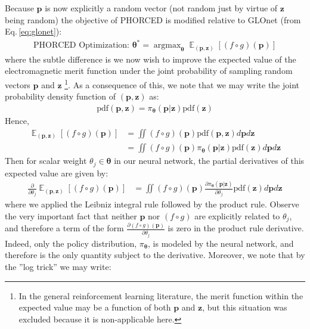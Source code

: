 \documentclass{article}
\DeclareMathOperator*{\argmax}{argmax}
\DeclareMathOperator*{\EX}{\mathbb{E}}%
\begin{document}
Because $\mathbf{p}$ is now explicitly a random vector (not random just by virtue of $\mathbf{z}$ being random) the objective of PHORCED is modified relative to GLOnet (from Eq.\,\eqref{eq:glonet}):
\begin{align}
    \boxed{\text{PHORCED Optimization: } {\boldsymbol{\theta}}^* = \argmax_{\boldsymbol{\theta}} \EX_{(\mathbf{p},\mathbf{z})}[(f\circ g)(\mathbf{p})]}
\end{align}
where the subtle difference is we now wish to improve the expected value of the electromagnetic merit function under the joint probability of sampling random vectors $\mathbf{p}$ and $\mathbf{z}$ \footnote{In the general reinforcement learning literature, the merit function within the expected value may be a function of both $\mathbf{p}$ and $\mathbf{z}$, but this situation was excluded because it is non-applicable here.}. As a consequence of this, we note that we may write the joint probability density function of $(\mathbf{p},\mathbf{z})$ as:
\begin{align}
    \text{pdf}(\mathbf{p},\mathbf{z})=\pi_{\boldsymbol{\theta}} (\mathbf{p}|\mathbf{z})\text{pdf}(\mathbf{z})
\end{align}
Hence,
\begin{align}
    \EX_{(\mathbf{p},\mathbf{z})}[(f\circ g)(\mathbf{p})]&=\iint (f\circ g)(\mathbf{p}) \text{pdf}(\mathbf{p},\mathbf{z})d\mathbf{p}d\mathbf{z} \\
    &=\iint (f\circ g)(\mathbf{p}) \pi_{\boldsymbol{\theta}}(\mathbf{p}|\mathbf{z})\text{pdf}(\mathbf{z})d\mathbf{p}d\mathbf{z}
\end{align}
Then for scalar weight $\theta_j\in \boldsymbol{\theta}$ in our neural network, the partial derivatives of this expected value are given by:
\begin{align}
    \frac{\partial}{\partial \theta_j}\EX_{(\mathbf{p},\mathbf{z})}[(f\circ g)(\mathbf{p})]&=\iint (f\circ g)(\mathbf{p}) \frac{\partial \pi_{\boldsymbol{\theta}}(\mathbf{p}|\mathbf{z})}{\partial \theta_j}\text{pdf}(\mathbf{z})d\mathbf{p}d\mathbf{z}\label{eq:phorced_pre_log}
\end{align}
where we applied the Leibniz integral rule followed by the product rule. Observe the very important fact that neither $\mathbf{p}$ nor $(f\circ g)$ are explicitly related to $\theta_j$, and therefore a term of the form $\frac{\partial(f\circ g)(\mathbf{p})}{\partial \theta_j}$ is zero in the product rule derivative. Indeed, only the policy distribution, $\pi_{\boldsymbol{\theta}}$, is modeled by the neural network, and therefore is the only quantity subject to the derivative. Moreover, we note that by the ''log trick'' we may write:
\end{document}
